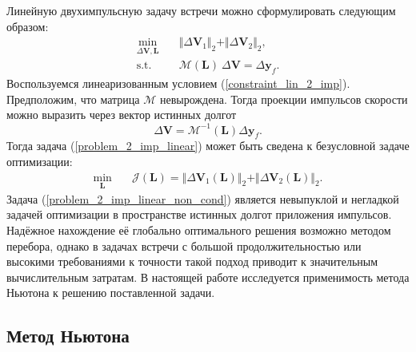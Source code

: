 Линейную двухимпульсную задачу встречи можно сформулировать следующим образом:
\begin{equation}
\begin{aligned}
    \min_{\Delta \mathbf{V}, \mathbf{L}} \quad &
    \Vert \Delta \mathbf{V}_1 \Vert_2 + \Vert \Delta \mathbf{V}_2 \Vert_2, \\
    \text{s.t.} \quad &\mathcal{M}(\mathbf{L}) \ \Delta \mathbf{V} = \Delta \mathbf{y}_f.
\end{aligned}
\label{problem_2_imp_linear}
\end{equation}
Воспользуемся линеаризованным условием (\ref{constraint_lin_2_imp}). Предположим, что матрица $\mathcal{M}$ невырождена. Тогда проекции импульсов скорости можно выразить через вектор истинных долгот
\begin{equation}
    \Delta \mathbf{V} = \mathcal{M}^{-1}(\mathbf{L}) \Delta \mathbf{y}_f.
\label{dv_M_inv_y_f}
\end{equation} 
Тогда задача (\ref{problem_2_imp_linear}) может быть сведена к безусловной задаче оптимизации:
\begin{equation}
\begin{aligned}
    \min_{\mathbf{L}} \quad &\mathcal{J}(\mathbf{L}) =
    \Vert \Delta \mathbf{V}_1 (\mathbf{L}) \Vert_2 + 
    \Vert \Delta \mathbf{V}_2 (\mathbf{L}) \Vert_2.
\end{aligned}
\label{problem_2_imp_linear_non_cond}
\end{equation}
Задача (\ref{problem_2_imp_linear_non_cond}) является невыпуклой и негладкой задачей оптимизации в пространстве истинных долгот приложения импульсов. Надёжное нахождение её глобально оптимального решения возможно методом перебора, однако в задачах встречи с большой продолжительностью или высокими требованиями к точности такой подход приводит к значительным вычислительным затратам. В настоящей работе исследуется применимость метода Ньютона к решению поставленной задачи.

\subsection{Метод Ньютона}


